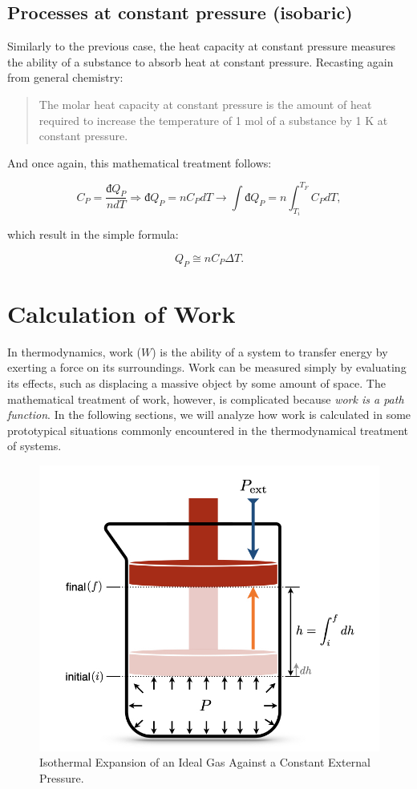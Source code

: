 \documentclass[
  9pt,
]{extbook}
\theoremstyle{definition}
\theoremstyle{definition}
\theoremstyle{definition}
\theoremstyle{remark}
\begin{document}
\hypertarget{heatconstp}{%
\subsection{Processes at constant pressure (isobaric)}\label{heatconstp}}

Similarly to the previous case, the heat capacity at constant pressure measures the ability of a substance to absorb heat at constant pressure. Recasting again from general chemistry:

\begin{quote}
The molar heat capacity at constant pressure is the amount of heat required to increase the temperature of 1 mol of a substance by 1 K at constant pressure.
\end{quote}

And once again, this mathematical treatment follows:

\begin{equation}
  C_P = \frac{đ Q_P}{n dT} \Rightarrow đ Q_P = n C_P dT \rightarrow \int đ Q_P = n \int_{T_i}^{T_F}C_P dT,
  \label{eq:Cpdef}
\end{equation}

which result in the simple formula:

\begin{equation}
  Q_P \cong n C_P \Delta T.
  \label{eq:Cpint}
\end{equation}

\hypertarget{workint}{%
\section{Calculation of Work}\label{workint}}

In thermodynamics, work (\(W\)) is the ability of a system to transfer energy by exerting a force on its surroundings. Work can be measured simply by evaluating its effects, such as displacing a massive object by some amount of space. The mathematical treatment of work, however, is complicated because \emph{work is a path function}. In the following sections, we will analyze how work is calculated in some prototypical situations commonly encountered in the thermodynamical treatment of systems.

\begin{figure}

{\centering \includegraphics[width=0.5\linewidth]{./img/OEP_Figures.004} 

}

\caption{Isothermal Expansion of an Ideal Gas Against a Constant External Pressure.}\label{fig:Fig2c3}
\end{figure}
\end{document}
